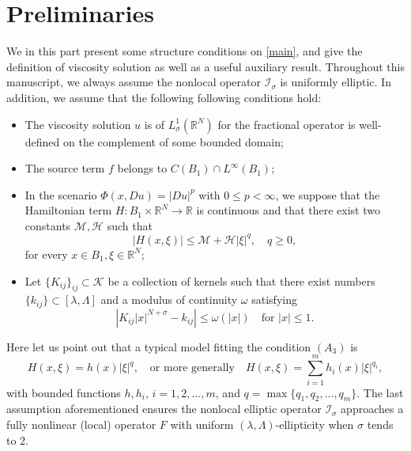 \documentclass[11pt,reqno]{amsart}
\numberwithin{equation}{section}
\begin{document}
\section{Preliminaries}
\label{sec2}

We in this part present some structure conditions on \eqref{main}, and give the definition of viscosity solution as well as a useful auxiliary result. Throughout this manuscript, we always assume the nonlocal operator $\mathcal{I}_\sigma$ is uniformly elliptic. In addition, we assume that the following following conditions hold:
\begin{itemize}
\item [($A_1$)] The viscosity solution $u$ is of $L^1_\sigma(\mathbb{R}^N)$ for the fractional operator is well-defined on the complement of some bounded domain;
\item [($A_2$)] The source term $f$ belongs to $C(B_1)\cap L^\infty(B_1)$;
\item [($A_3$)] In the scenario $\Phi(x,Du)=|Du|^p$ with $0\le p<\infty$, we suppose that the Hamiltonian term $H:B_1\times \mathbb{R}^N\rightarrow \mathbb{R}$ is continuous
and that there exist two constants $\mathcal{M},\mathcal{H}$ such that
    \begin{equation}
    \label{2-1}
    |H(x,\xi)|\le \mathcal{M}+\mathcal{H}|\xi|^q, \quad q\ge0,
    \end{equation}
    for every $x\in B_1, \xi\in \mathbb{R}^N$;
\item [($A_4$)] Let $\{K_{ij}\}_{ij}\subset \mathcal{K}$ be a collection of kernels such that there exist numbers $\{k_{ij}\}\subset[\lambda,\Lambda]$ and a modulus of continuity $\omega$ satisfying
    $$
    \left|K_{ij}|x|^{N+\sigma}-k_{ij}\right|\le\omega(|x|) \quad\text{for } |x|\le1.
    $$
\end{itemize}
Here let us point out that a typical model fitting the condition $(A_3)$ is
$$
H(x,\xi)=h(x)|\xi|^q,
\quad \text{or more generally}\quad
H(x,\xi)=\sum^m_{i=1}h_i(x)|\xi|^{q_i},
$$
with bounded functions $h,h_i$, $i=1,2,\ldots,m$, and $q=\max\{q_1,q_2,\ldots,q_m\}$. The last assumption aforementioned ensures the nonlocal elliptic operator $\mathcal{I}_\sigma$ approaches a fully nonlinear (local) operator $F$ with uniform $(\lambda,\Lambda)$-ellipticity when $\sigma$ tends to 2.
\end{document}
